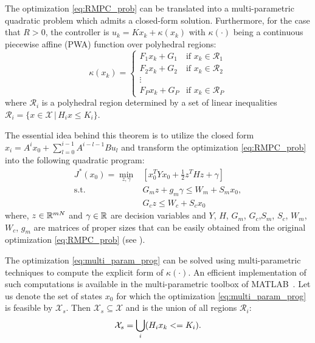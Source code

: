 \begin{theorem}
The optimization \eqref{eq:RMPC_prob} can be translated into a multi-parametric quadratic problem which admits a closed-form solution. Furthermore, for the case that $R>0$, the controller is $u_k = K x_k + \kappa(x_k)$ with $\kappa(\cdot)$ being a continuous piecewise affine (PWA) function over polyhedral regions:
\begin{equation}
\kappa(x_k)=
\begin{cases}
F_1x_k+G_1 & \text{if $x_k\in \mathcal{R}_1$}\\
F_2x_k+G_2 & \text{if $x_k\in \mathcal{R}_2$}\\
\vdots\\
F_Px_k+G_P & \text{if $x_k\in \mathcal{R}_P$}
\end{cases} 
\end{equation}
where $\mathcal{R}_i$ is a polyhedral region determined by a set of linear inequalities $\mathcal R_i = \{x\in\mathcal X\,|\,H_ix\leq K_i\}$. 
\end{theorem}
The essential idea behind this theorem is to utilize the closed form $x_i=A^ix_0+\sum_{l=0}^{i-1}A^{i-l-1}Bu_l$ and transform the optimization \eqref{eq:RMPC_prob} into the following quadratic program:
\begin{align}
\label{eq:multi_param_prog}
J^{\ast}(x_0)=\min_{z,\gamma}& \left[x_0^TYx_0+\frac{1}{2}z^THz+\gamma\right]\\
\text{s.t.} \quad &G_mz+g_m\gamma\leq W_m+S_mx_0,\nonumber\\
&G_cz\leq W_c+S_cx_0\nonumber
\end{align}
where, $z\in \mathbb{R}^{mN}$ and $\gamma\in\mathbb{R}$ are decision variables and $Y$, $H$, $G_m$, $G_c$,$S_m$, $S_c$, $W_m$, $W_c$, $g_m$ are matrices of proper sizes that can be easily obtained from the original optimization \eqref{eq:RMPC_prob}  (see \cite{delaPea:2005}).


The optimization \eqref{eq:multi_param_prog} can be solved using multi-parametric techniques to compute the explicit form of $\kappa(\cdot)$.
An efficient implementation of such computations is available in the multi-parametric toolbox of MATLAB~\cite{matlabMPT, matlabYALMIP}.
Let us denote the set of states $x_0$ for which the optimization  \eqref{eq:multi_param_prog} is feasible by $\mathcal X_s$. Then $\mathcal X_s\subseteq \mathcal X$ and is the union of all regions $\mathcal{R}_{i}$:
\begin{equation}
\mathcal X_s = \bigcup_{i}(H_{i}x_{k}<=K_{i}).
\end{equation}


